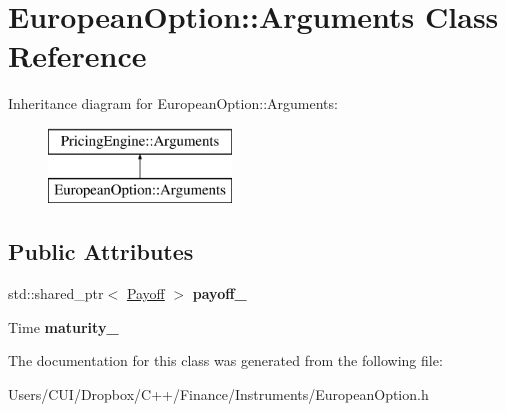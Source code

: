 \hypertarget{class_european_option_1_1_arguments}{}\section{European\+Option\+:\+:Arguments Class Reference}
\label{class_european_option_1_1_arguments}
Inheritance diagram for European\+Option\+:\+:Arguments\+:\begin{figure}[H]
\begin{center}
\leavevmode
\includegraphics[height=2.000000cm]{class_european_option_1_1_arguments}
\end{center}
\end{figure}
\subsection*{Public Attributes}
\begin{DoxyCompactItemize}
\item 
\hypertarget{class_european_option_1_1_arguments_a01a26c6641a2bb9f439c4191c5eb7d76}{}\label{class_european_option_1_1_arguments_a01a26c6641a2bb9f439c4191c5eb7d76} 
std\+::shared\+\_\+ptr$<$ \hyperlink{class_payoff}{Payoff} $>$ {\bfseries payoff\+\_\+}
\item 
\hypertarget{class_european_option_1_1_arguments_a75cb97c8679f5827e3faa8db031e5196}{}\label{class_european_option_1_1_arguments_a75cb97c8679f5827e3faa8db031e5196} 
Time {\bfseries maturity\+\_\+}
\end{DoxyCompactItemize}


The documentation for this class was generated from the following file\+:\begin{DoxyCompactItemize}
\item 
Users/\+C\+U\+I/\+Dropbox/\+C++/\+Finance/\+Instruments/European\+Option.\+h\end{DoxyCompactItemize}
